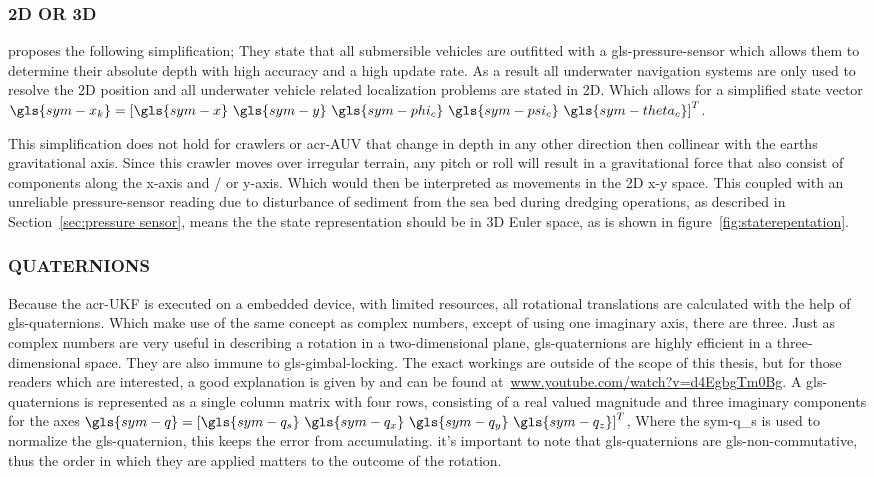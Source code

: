 \subsubsection{2D OR 3D}

\citet{bahr_cooperative_2009} proposes the following simplification; They state that all submersible vehicles are
outfitted with a \gls{gls-pressure-sensor} which allows them to determine their absolute depth with high accuracy and
a high
update rate. As a result all underwater navigation systems are only used to resolve the 2D position and all underwater
vehicle related localization problems are stated in 2D. Which allows for a simplified state vector \( \gls{sym-x_k} =
\left[\gls{sym-x} ~\gls{sym-y} ~\gls{sym-phi_c} ~\gls{sym-psi_c} ~\gls{sym-theta_c}\right]^T \).

This simplification does not hold for crawlers or \gls{acr-AUV} that change in depth in any other direction then
collinear with the earths gravitational axis. Since this crawler moves over irregular terrain, any pitch or roll will
result in a gravitational force that also consist of components along the x-axis and / or y-axis. Which would then be
interpreted as movements in the 2D x-y space. This coupled with an unreliable pressure-sensor reading due to
disturbance of sediment from the sea bed during dredging operations, as described in Section~\ref{sec:pressure sensor},
means the the state representation should be in 3D Euler space, as is shown in figure~\ref{fig:staterepentation}.

\subsubsection{QUATERNIONS}

Because the \gls{acr-UKF} is executed on a embedded device, with limited resources, all rotational translations are
calculated with the help of \gls{gls-quaternion}s. Which make use of the same concept as complex numbers, except of
using one imaginary axis, there are three. Just as complex numbers are very useful in describing a rotation in a
two-dimensional plane, \gls{gls-quaternion}s are highly efficient in a three-dimensional space. They are also immune to
\gls{gls-gimbal-lock}ing. The exact workings are outside of the scope of this thesis, but for those readers which are
interested, a good explanation is given by \citet{3blue1brown_quaternions_2018} and can be found
at~\url{www.youtube.com/watch?v=d4EgbgTm0Bg}. A \gls{gls-quaternion}s is represented as a single column matrix with four
rows, consisting of a real valued magnitude and three imaginary components for the axes \(\gls{sym-q} =
\left[\gls{sym-q_s} ~\gls{sym-q_x} ~\gls{sym-q_y}  ~\gls{sym-q_z} \right]^T \), Where the \gls{sym-q_s} is used to
normalize the \gls{gls-quaternion}, this keeps the error from accumulating. it's important to note that
\gls{gls-quaternion}s are \gls{gls-non-commutative}, thus the order in which they are applied matters to the outcome of
the rotation.

